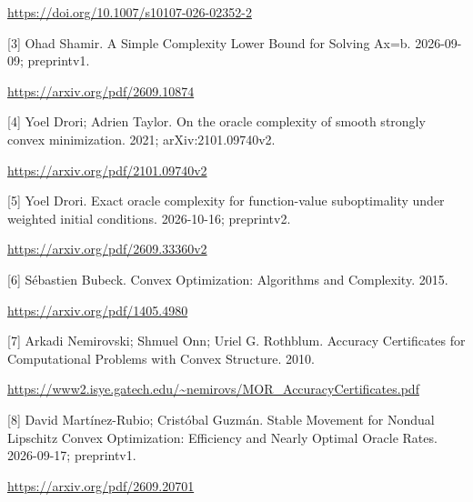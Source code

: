 \documentclass[10pt,a4paper]{article}
\begin{document}
\url{https://doi.org/10.1007/s10107-026-02352-2}

[3] Ohad Shamir. A Simple Complexity Lower Bound for Solving Ax=b. 2026-09-09; preprintv1.

\url{https://arxiv.org/pdf/2609.10874}

[4] Yoel Drori; Adrien Taylor. On the oracle complexity of smooth strongly convex minimization. 2021; arXiv:2101.09740v2.

\url{https://arxiv.org/pdf/2101.09740v2}

[5] Yoel Drori. Exact oracle complexity for function-value suboptimality under weighted initial conditions. 2026-10-16; preprintv2.

\url{https://arxiv.org/pdf/2609.33360v2}

[6] Sébastien Bubeck. Convex Optimization: Algorithms and Complexity. 2015.

\url{https://arxiv.org/pdf/1405.4980}

[7] Arkadi Nemirovski; Shmuel Onn; Uriel G. Rothblum. Accuracy Certificates for Computational Problems with Convex Structure. 2010.

\url{https://www2.isye.gatech.edu/~nemirovs/MOR_AccuracyCertificates.pdf}

[8] David Martínez-Rubio; Cristóbal Guzmán. Stable Movement for Nondual Lipschitz Convex Optimization: Efficiency and Nearly Optimal Oracle Rates. 2026-09-17; preprintv1.

\url{https://arxiv.org/pdf/2609.20701}
\end{document}
